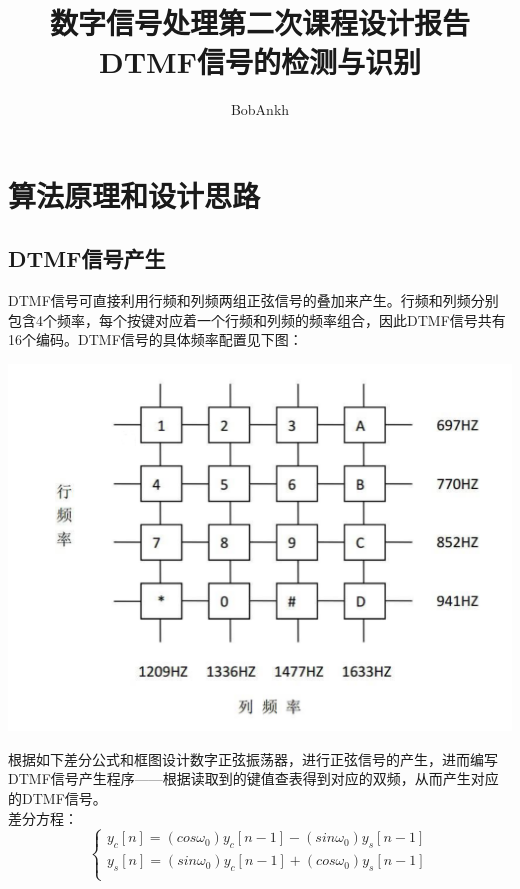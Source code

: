 \documentclass[10pt, a4paper]{article}
\begin{document}
\title{数字信号处理第二次课程设计报告\\\textbf{DTMF信号的检测与识别}}
\author{BobAnkh}

\maketitle

\section{算法原理和设计思路}

\subsection{DTMF信号产生}

    DTMF信号可直接利用行频和列频两组正弦信号的叠加来产生。行频和列频分别包含4个频率，每个按键对应着一个行频和列频的频率组合，因此DTMF信号共有16个编码。DTMF信号的具体频率配置见下图：
    
    \centerline{\includegraphics[scale=0.4]{assets/1.png}}
    
    根据如下差分公式和框图设计数字正弦振荡器，进行正弦信号的产生，进而编写DTMF信号产生程序——根据读取到的键值查表得到对应的双频，从而产生对应的DTMF信号。\\
    
    
    差分方程：
    $$
    \left\{ 
    \begin{array}{c}
        y_c[n]=(cos\omega_0)y_c[n-1]-(sin\omega_0)y_s[n-1] \\  y_s[n]=(sin\omega_0)y_c[n-1]+(cos\omega_0)y_s[n-1] \\
    \end{array}
    \right. 
    $$
    
\end{document}
